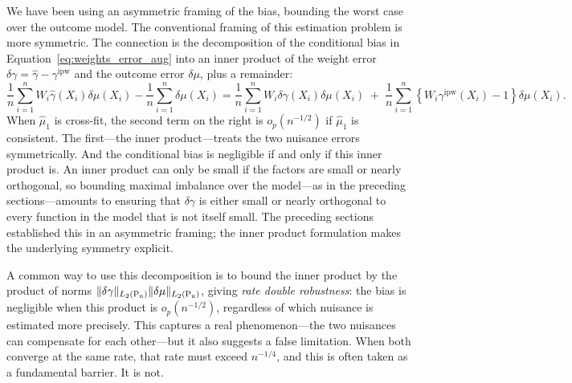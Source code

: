 \documentclass{article}
\DeclarePairedDelimiter\norm{\lVert}{\rVert}
\theoremstyle{definition}
\newcommand{\ipw}{\text{ipw}}
\newcommand{\dgamma}{\delta\gamma}
\newcommand{\dm}{\delta \mu}
\DeclareMathOperator{\Pn}{P_n}
\newcommand{\hgamma}{\ensuremath{\hat\gamma}}
\newcommand{\gammaipw}{\ensuremath{\gamma^{\ipw}}}
\newcommand{\<}{\langle}
\renewcommand{\>}{\rangle}
\begin{document}
We have been using an asymmetric framing of the bias, bounding the worst case over the outcome model. The conventional framing of this estimation problem is more symmetric. The connection is the decomposition of the conditional bias in Equation~\ref{eq:weights_error_aug} into an inner product of the weight error $\dgamma = \hgamma - \gammaipw$ and the outcome error $\dm$, plus a remainder:
\begin{equation}
    \label{eq:aug_bias_dr}
    \frac{1}{n}\sum_{i=1}^n W_i \hgamma(X_i) \dm(X_i) - \frac{1}{n}\sum_{i=1}^n \dm(X_i) = \frac{1}{n}\sum_{i=1}^nW_i \delta\gamma(X_i) \dm(X_i) \;+\; \frac{1}{n}\sum_{i=1}^n \left\{W_i \gammaipw(X_i) - 1\right\}\dm(X_i).
\end{equation}
When $\hat \mu_1$ is cross-fit, the second term on the right is $o_p(n^{-1/2})$ if $\hat \mu_1$ is consistent. The first---the inner product---treats the two nuisance errors symmetrically. And the conditional bias is negligible if and only if this inner product is. An inner product can only be small if the factors are small or nearly orthogonal, so bounding maximal imbalance over the model---as in the preceding sections---amounts to ensuring that $\dgamma$ is either small or nearly orthogonal to every function in the model that is not itself small. The preceding sections established this in an asymmetric framing; the inner product formulation makes the underlying symmetry explicit.

A common way to use this decomposition is to bound the inner product by the product of norms $\norm{\delta\gamma}_{L_2(\Pn)}\norm{\dm}_{L_2(\Pn)}$, giving \emph{rate double robustness}: the bias is negligible when this product is $o_p(n^{-1/2})$, regardless of which nuisance is estimated more precisely. This captures a real phenomenon---the two nuisances can compensate for each other---but it also suggests a false limitation. When both converge at the same rate, that rate must exceed $n^{-1/4}$, and this is often taken as a fundamental barrier. It is not.
\end{document}
